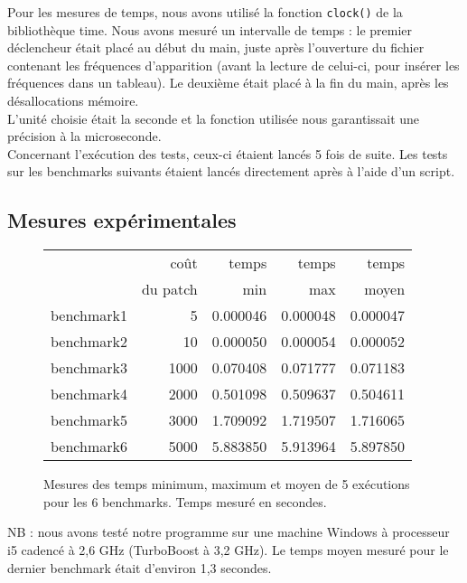 \documentclass[a4paper, 10pt, french]{article}
\begin{document}
Pour les mesures de temps, nous avons utilisé la fonction \texttt{clock()} de la bibliothèque time. Nous avons mesuré un intervalle de temps : le premier déclencheur était placé au début du main, juste après l'ouverture du fichier contenant les fréquences d'apparition (avant la lecture de celui-ci, pour insérer les fréquences dans un tableau). Le deuxième était placé à la fin du main, après les désallocations mémoire.\\ L'unité choisie était la seconde et la fonction utilisée nous garantissait une précision à la microseconde.\\ 
Concernant l'exécution des tests, ceux-ci étaient lancés 5 fois de suite. Les tests sur les benchmarks suivants étaient lancés directement après à l'aide d'un script.

  \subsection{Mesures expérimentales}

    \begin{figure}[h]
      \begin{center}
        \begin{tabular}{|l||r||r|r|r||}
          \hline
          \hline
            & coût         & temps     & temps   & temps \\
            & du patch     & min       & max     & moyen \\
          \hline
          \hline
            benchmark1 &   5   & 0.000046    & 0.000048    &    0.000047  \\
          \hline
            benchmark2 &    10  &   0.000050   &   0.000054   &    0.000052  \\
          \hline
            benchmark3 &     1000 &  0.070408   &  0.071777   &  0.071183  \\
          \hline
            benchmark4 &    2000  & 0.501098    &  0.509637   &  0.504611
   \\
          \hline
            benchmark5 &   3000   &  1.709092   &  1.719507   &   1.716065
  \\
          \hline
            benchmark6 &   5000   &  5.883850   &  5.913964   &  5.897850   \\
          \hline
          \hline
        \end{tabular}
        \caption{Mesures des temps minimum, maximum et moyen de 5 exécutions pour les 6 benchmarks. Temps mesuré en secondes.}
        
        \label{table-temps}
      \end{center}
    \end{figure}
    NB : nous avons testé notre programme sur une machine Windows à processeur i5 cadencé à 2,6 GHz (TurboBoost à 3,2 GHz). Le temps moyen mesuré pour le dernier benchmark était d'environ 1,3 secondes. 
\end{document}
